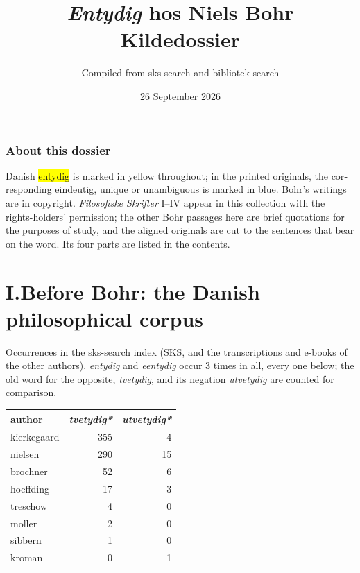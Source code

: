 \documentclass[11pt]{article}
\title{\emph{Entydig} hos Niels Bohr\\[0.5ex]\large Kildedossier}
\author{Compiled from sks-search and bibliotek-search}
\date{26 September 2026}
\newcommand{\tlg}[1]{{\setlength{\fboxsep}{0.8pt}\colorbox{yellow}{#1}}}
\newcommand{\olg}[1]{{\setlength{\fboxsep}{0.8pt}\colorbox{cyan!25}{#1}}}
\begin{document}
\maketitle
\begin{otherlanguage}{english}

\section{About this dossier}
\noindent Danish \tlg{entydig} is marked in yellow throughout; in the printed
originals, the corresponding \olg{eindeutig}, \olg{unique} or \olg{unambiguous}
is marked in blue. Bohr's writings are in copyright. \emph{Filosofiske Skrifter} I--IV appear in this collection with the rights-holders' permission; the other Bohr passages here are brief quotations for the purposes of study, and the aligned originals are cut to the sentences that bear on the word. Its four parts are listed in the contents.
\end{otherlanguage}
\tableofcontents
\clearpage
\part*{I.\quad Before Bohr: the Danish philosophical corpus}

\noindent Occurrences in the sks-search index (SKS, and the transcriptions and e-books of the other authors). \emph{entydig} and \emph{eentydig} occur 3 times in all, every one below; the old word for the opposite, \emph{tvetydig}, and its negation \emph{utvetydig} are counted for comparison.

\begin{center}\begin{tabular}{@{}lrr@{}}\toprule
author & \emph{tvetydig*} & \emph{utvetydig*}\\\midrule
kierkegaard & 355 & 4 \\
nielsen & 290 & 15 \\
brochner & 52 & 6 \\
hoeffding & 17 & 3 \\
treschow & 4 & 0 \\
moller & 2 & 0 \\
sibbern & 1 & 0 \\
kroman & 0 & 1 \\
\bottomrule\end{tabular}\end{center}
\end{document}
